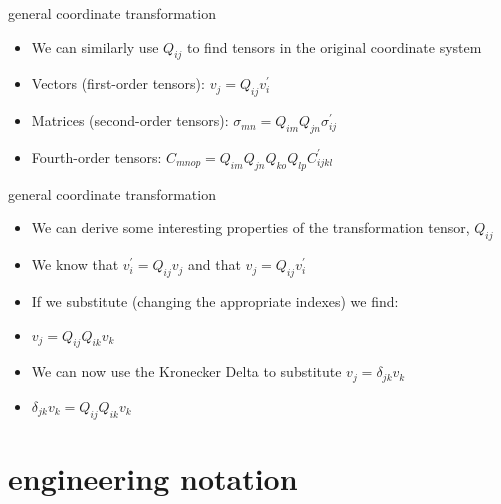 \documentclass[
  letterpaper,
  ignorenonframetext,
  aspectratio=43,
  handout,
  12pt]{beamer}
\providecommand{\tightlist}{%
  \setlength{\itemsep}{0pt}\setlength{\parskip}{0pt}}
\providecommand{\tightlist}{%
\setlength{\itemsep}{0pt}\setlength{\parskip}{0pt}}
\begin{document}
\begin{frame}{general coordinate transformation}
\protect\hypertarget{general-coordinate-transformation-2}{}
\begin{itemize}
\tightlist
\item
  We can similarly use \(Q_{ij}\) to find tensors in the original
  coordinate system
\item
  Vectors (first-order tensors): \(v_j = Q_{ij} v_i^\prime\)
\item
  Matrices (second-order tensors):
  \(\sigma_{mn} = Q_{im}Q_{jn} \sigma_{ij}^\prime\)
\item
  Fourth-order tensors:
  \(C_{mnop} = Q_{im}Q_{jn}Q_{ko}Q_{lp} C_{ijkl}^\prime\)
\end{itemize}
\end{frame}

\begin{frame}{general coordinate transformation}
\protect\hypertarget{general-coordinate-transformation-3}{}
\begin{itemize}
\tightlist
\item
  We can derive some interesting properties of the transformation
  tensor, \(Q_{ij}\)
\item
  We know that \(v_i^\prime = Q_{ij} v_j\) and that
  \(v_j = Q_{ij} v_i^\prime\)
\item
  If we substitute (changing the appropriate indexes) we find:
\item
  \(v_j = Q_{ij} Q_{ik} v_k\)
\item
  We can now use the Kronecker Delta to substitute
  \(v_j = \delta_{jk}v_k\)
\item
  \(\delta_{jk}v_k = Q_{ij} Q_{ik} v_k\)
\end{itemize}
\end{frame}

\hypertarget{engineering-notation}{%
\section{engineering notation}\label{engineering-notation}}
\end{document}

